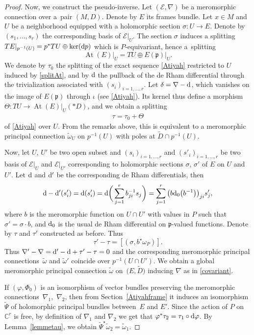 \documentclass[pdftex]{sigma}
\numberwithin{equation}{section}
\begin{document}
\begin{proof}
 Now, we construct the pseudo-inverse. Let $(\mathcal{E},\nabla)$ be a meromorphic connection over a~pair $(M,D)$. Denote by $E$ its frames bundle. Let $x\in M$ and $U$ be a neighborhood equipped with a holomorphic section $\sigma\colon U \longrightarrow E$. Denote by $(s_1,\dots,s_r)$ the corresponding basis of $\mathcal{E}\vert_U$. The section $\sigma$ induces a splitting $TE\vert_{p^{-1}(U)} = p^* TU \oplus \ker({\rm d}p)$ which is $P$-equivariant, hence a~splitting
 \begin{equation}\label{splitAt} \operatorname{At}(E)\vert_U = TU \oplus E(\mathfrak{p})\vert_U.
 \end{equation}
 We denote by $\tau_0$ the splitting of the exact sequence \eqref{Atiyah} restricted to $U$ induced by \eqref{splitAt}, and by ${\rm d}$ the pullback of the de Rham differential through the trivialization associated with $(s_i)_{i=1,\dots,r}$. Let $\delta = \nabla-{\rm d}$, which vanishes on the image of $E(\mathfrak{p})$ through $\iota$ (see \eqref{Atiyah}). Its kernel thus define a morphism $\Theta\colon TU \longrightarrow \operatorname{At}(E)\vert_U(* D)$, and we obtain a splitting
 \begin{gather*}%
 \tau= \tau_0 +\Theta
 \end{gather*}
 of \eqref{Atiyah} over $U$. From the remarks above, this is equivalent to a meromorphic principal connection $\tilde{\omega}_U$ on $p^{-1}(U)$ with poles at $\tilde{D}\cap p^{-1}(U)$.

 Now, let $U$, $U'$ be two open subset and $(s_i)_{i=1,\dots,r}$ and $(s'_i)_{i=1,\dots,r}$ be two basis of $\mathcal{E}\vert_U$ and $\mathcal{E}\vert_{U'}$ corresponding to holomorphic sections $\sigma$, $\sigma'$ of $E$ on $U$ and $U'$. Let ${\rm d}$ and ${\rm d}'$ be the corresponding de Rham differentials, then
 \begin{gather*}
 {\rm d}-{\rm d}'(s'_i) = {\rm d}(s'_i) = {\rm d}\bigg(\sum_{j=1}^{r} b^{-1}_{ji} s_j\bigg) = \sum_{j=1}^{r}\big(b{\rm d}_0\big(b^{-1}\big)\big)_{ji} s'_j,
 \end{gather*}
 where $b$ is the meromorphic function on $U\cap U'$ with values in $P$ such that $\sigma' = \sigma \cdot b$, and ${\rm d}_0$ is the usual de Rham differential on $\mathfrak{p}$-valued functions. Denote by $\tau$ and $\tau'$ constructed as before. Thus
\[
 \tau'-\tau= [(\sigma,b^\star \omega_P)].\]
 Thus $\nabla'-\nabla = {\rm d}'-{\rm d} + \tau'-\tau =0$ and the corresponding meromorphic principal connections~$\tilde{\omega}$ and $\tilde{\omega}'$ coincide over $p^{-1}(U\cap U')$. We obtain a global meromorphic principal connection $\tilde{\omega}$ on~$\big(E,\tilde{D}\big)$ inducing $\nabla$ as in \eqref{covariant}.

 If $(\varphi,\Phi_0)$ is an isomorphism of vector bundles preserving the meromorphic connections~$\nabla_1$,~$\nabla_2$, then from Section~\ref{Atiyahframe} it induces an isomorphism $\tilde{\Psi}$ of holomorphic principal bundles between~$E$ and $E'$. Since the action of $P$ on $\mathbb{C}^r$ is free, by definition of $\nabla_1$ and $\nabla_2$ we get that $\varphi^*\tau_2 = \tau_1 \circ {\rm d}\varphi$. By Lemma~\ref{lemmetau}, we obtain $\tilde{\Psi}^\star \tilde{\omega}_2 = \tilde{\omega}_1$.
\end{proof}
\end{document}
